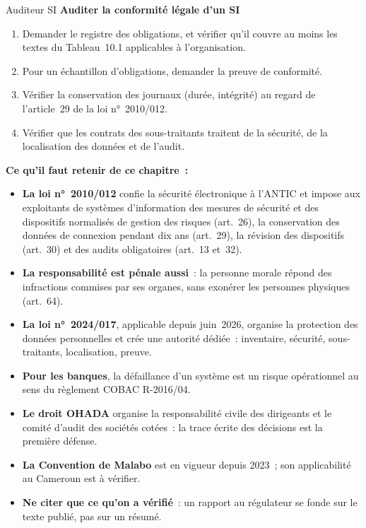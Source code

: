 \begin{boxmetier}{Auditeur SI}
\textbf{Auditer la conformité légale d'un SI}
\begin{enumerate}
    \item Demander le registre des obligations, et vérifier qu'il couvre au
          moins les textes du Tableau~10.1 applicables à l'organisation.
    \item Pour un échantillon d'obligations, demander la preuve de
          conformité.
    \item Vérifier la conservation des journaux (durée, intégrité) au
          regard de l'article~29 de la loi n°~2010/012.
    \item Vérifier que les contrats des sous-traitants traitent de la
          sécurité, de la localisation des données et de l'audit.
\end{enumerate}
\end{boxmetier}

\separateur

\begin{boxresume}
\textbf{Ce qu'il faut retenir de ce chapitre~:}
\begin{itemize}
    \item \textbf{La loi n°~2010/012} confie la sécurité électronique à
          l'ANTIC et impose aux exploitants de systèmes d'information des
          mesures de sécurité et des dispositifs normalisés de gestion des
          risques (art.~26), la conservation des données de connexion
          pendant dix ans (art.~29), la révision des dispositifs (art.~30)
          et des audits obligatoires (art.~13 et~32).
    \item \textbf{La responsabilité est pénale aussi}~: la personne morale
          répond des infractions commises par ses organes, sans exonérer
          les personnes physiques (art.~64).
    \item \textbf{La loi n°~2024/017}, applicable depuis juin~2026, organise
          la protection des données personnelles et crée une autorité
          dédiée~: inventaire, sécurité, sous-traitants, localisation,
          preuve.
    \item \textbf{Pour les banques}, la défaillance d'un système est un
          risque opérationnel au sens du règlement COBAC R-2016/04.
    \item \textbf{Le droit OHADA} organise la responsabilité civile des
          dirigeants et le comité d'audit des sociétés cotées~: la trace
          écrite des décisions est la première défense.
    \item \textbf{La Convention de Malabo} est en vigueur depuis 2023~;
          son applicabilité au Cameroun est à vérifier.
    \item \textbf{Ne citer que ce qu'on a vérifié}~: un rapport au
          régulateur se fonde sur le texte publié, pas sur un résumé.
\end{itemize}
\end{boxresume}

